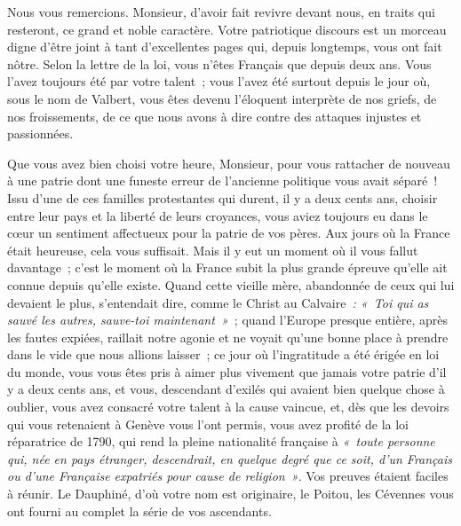 \documentclass[french,twoside]{book} %
\newcommand\orgName[1]{#1}
\newcommand\persName[1]{#1}
\newcommand\placeName[1]{#1}
\begin{document}
Nous vous remercions. Monsieur, d’avoir fait revivre devant nous, en traits qui resteront, ce grand et noble caractère. Votre patriotique discours est un morceau digne d’être joint à tant d’excellentes pages qui, depuis longtemps, vous ont fait nôtre. Selon la lettre de la loi, vous n’êtes Français que depuis deux ans. Vous l’avez toujours été par votre talent ; vous l’avez été surtout depuis le jour où, sous le nom de {\persName Valbert}, vous êtes devenu l’éloquent interprète de nos griefs, de nos froissements, de ce que nous avons à dire contre des attaques injustes et passionnées.\par
Que vous avez bien choisi votre heure, Monsieur, pour vous rattacher de nouveau à une patrie dont une funeste erreur de l’ancienne politique vous avait séparé ! Issu d’une de ces familles protestantes qui durent, il y a deux cents ans, choisir entre leur pays et la liberté de leurs croyances, vous aviez toujours eu dans le cœur un sentiment affectueux pour la patrie de vos pères. Aux jours où la {\orgName France} était heureuse, cela vous suffisait. Mais il y eut un moment où il vous fallut davantage ; c’est le moment où la {\orgName France} subit la plus grande épreuve qu’elle ait connue depuis qu’elle existe. Quand cette vieille mère, abandonnée de ceux qui lui devaient le plus, s’entendait dire, comme le {\persName Christ} au {\placeName Calvaire} \emph{: « Toi qui as sauvé les autres, sauve-toi maintenant »} ; quand l’Europe presque entière, après les fautes expiées, raillait notre agonie et ne voyait qu’une bonne place à prendre dans le vide que nous allions laisser ; ce jour où l’ingratitude a été érigée en loi du monde, vous vous êtes pris à aimer plus vivement que jamais votre patrie d’il y a deux cents ans, et vous, descendant d’exilés qui avaient bien quelque chose à oublier, vous avez consacré votre talent à la cause vaincue, et, dès que les devoirs qui vous retenaient à {\placeName Genève} vous l’ont permis, vous avez profité de la loi réparatrice de 1790, qui rend la pleine nationalité française à \emph{« toute personne qui, née en pays étranger, descendrait, en quelque degré que ce soit, d’un Français ou d’une Française expatriés pour cause de religion »}. Vos preuves étaient faciles à réunir. Le {\placeName Dauphiné}, d’où votre nom est originaire, le {\placeName Poitou}, les {\placeName Cévennes} vous ont fourni au complet la série de vos ascendants.\par
\end{document}
